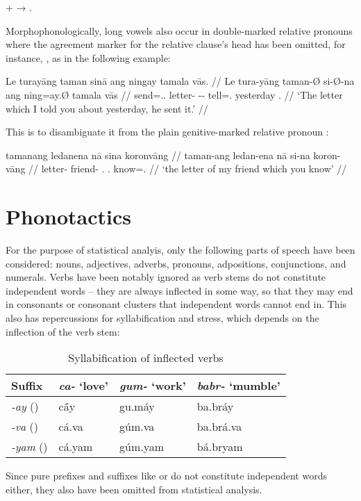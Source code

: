 \ex {} +  → . \xe

Morphophonologically, long vowels also occur in double-marked relative pronouns 
where the agreement marker for the relative clause's head has been omitted,
for instance, , as in the following 
example:

\ex\begingl
	\gla Le turayāng taman sinā ang ningay tamala vās. //
	\glb Le tura-yāng taman-Ø si-Ø-na ang ning=ay.Ø tamala vās //
	\glc \PatTI{} send=\Tsg{}.\M{}.\Aarg{} letter-\Top{} \Rel{}-\PatTI{}-\Gen{} \AgtT{} tell=\Fsg{}.\Top{} yesterday \Ssg{}.\Parg{} //
	\glft `The letter which I told you about yesterday, he sent it.' //
\endgl\xe

This is to disambiguate it from the plain genitive-marked relative pronoun 
:

\ex\begingl
	\gla tamanang ledanena nā sina koronvāng //
	\glb taman-ang ledan-ena nā si-na koron-vāng //
	\glc letter-\Aarg{} friend-\Gen{} \Fsg.\Gen{} \Rel{}.\Gen{} know=\Ssg{}.\Aarg{} //
	\glft `the letter of my friend which you know' //
\endgl\xe

\section{Phonotactics}

For the purpose of statistical analyis, only the following parts of speech have 
been considered: nouns, adjectives, adverbs, pronouns, adpositions, 
conjunctions, and numerals. Verbs have been notably ignored as verb stems do 
not constitute independent words -- they are always inflected in some way, so 
that they may end in consonants or consonant clusters that independent words 
cannot end in. This also has repercussions for syllabification and stress, 
which depends on the inflection of the verb stem:

\begin{table}[h]
\label{ex:verbsyll}
\caption{Syllabification of inflected verbs}
\begin{tabu} to \linewidth {X[2l] X[3c] X[3c] X[3c]}
\toprule\tableheaderfont
Suffix
	& \emph{ca-} `love'
	& \emph{gum-} `work'
	& \emph{babr-} `mumble'
	\\

\toprule

\emph{-ay} (\Fsg{})
	& cā́y
	& gu.máy
	& ba.bráy
	\\

\emph{-va} (\Ssg{})
	& cá.va
	& gúm.va
	& ba.brá.va
	\\

\emph{-yam} (\Ptcp{})
	& cá.yam
	& gúm.yam
	& bá.bryam
	\\

\bottomrule
\end{tabu}
\end{table}

Since pure prefixes and suffixes like  or 
 do not constitute independent words either, 
they also have been omitted from statistical analysis.
